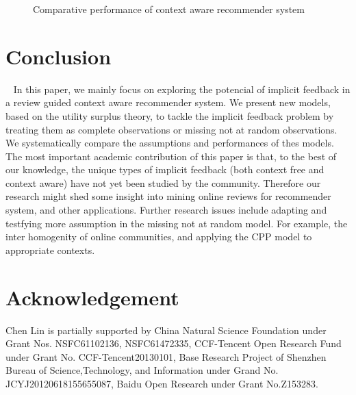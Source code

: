 \documentclass[preprint,12pt]{elsarticle}
\begin{document}
\begin{figure}[!hbp]
\centering
{}
\hspace{0pt}
\vspace{0pt}
\caption{Comparative performance of context aware recommender system}
\end{figure}

\section{Conclusion}~\label{sec:con}
In this paper, we mainly focus on exploring the potencial of implicit feedback in a review guided context aware recommender system. We present new models, based on the utility surplus theory,  to tackle the implicit feedback problem by treating them as complete observations or missing not at random observations. We systematically compare the assumptions and performances of thes models.
The most important academic contribution of this paper is that, to the best of our
knowledge, the unique types of implicit feedback (both context free and context aware) have not yet been studied by the community. Therefore our research might shed some insight into mining online reviews for recommender system, and other applications.
Further research issues include adapting and testfying more assumption in the missing not at random model. 
For example, the inter homogenity of online communities, and applying the CPP model to appropriate contexts. 

\section{Acknowledgement}
Chen Lin is partially supported by  China Natural Science Foundation under Grant Nos. NSFC61102136, NSFC61472335, CCF-Tencent Open Research Fund under Grant No. CCF-Tencent20130101, Base Research Project of Shenzhen Bureau of Science,Technology, and Information under Grand No. JCYJ20120618155655087, Baidu Open Research under Grant No.Z153283.
\end{document}
